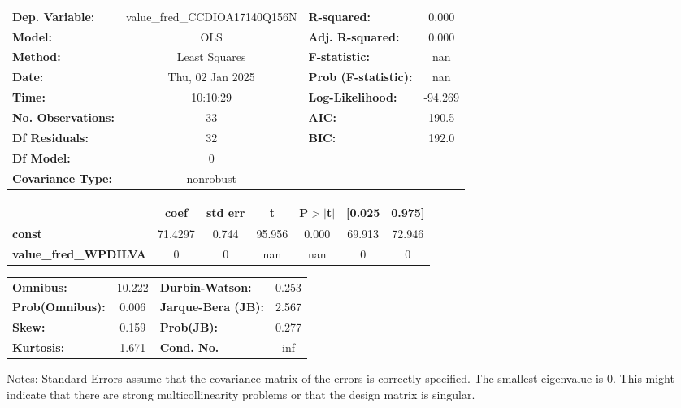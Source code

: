\begin{center}
\begin{tabular}{lclc}
\toprule
\textbf{Dep. Variable:}       & value\_fred\_CCDIOA17140Q156N & \textbf{  R-squared:         } &     0.000   \\
\textbf{Model:}               &              OLS              & \textbf{  Adj. R-squared:    } &     0.000   \\
\textbf{Method:}              &         Least Squares         & \textbf{  F-statistic:       } &       nan   \\
\textbf{Date:}                &        Thu, 02 Jan 2025       & \textbf{  Prob (F-statistic):} &      nan    \\
\textbf{Time:}                &            10:10:29           & \textbf{  Log-Likelihood:    } &   -94.269   \\
\textbf{No. Observations:}    &                 33            & \textbf{  AIC:               } &     190.5   \\
\textbf{Df Residuals:}        &                 32            & \textbf{  BIC:               } &     192.0   \\
\textbf{Df Model:}            &                  0            & \textbf{                     } &             \\
\textbf{Covariance Type:}     &           nonrobust           & \textbf{                     } &             \\
\bottomrule
\end{tabular}
\begin{tabular}{lcccccc}
                              & \textbf{coef} & \textbf{std err} & \textbf{t} & \textbf{P$> |$t$|$} & \textbf{[0.025} & \textbf{0.975]}  \\
\midrule
\textbf{const}                &      71.4297  &        0.744     &    95.956  &         0.000        &       69.913    &       72.946     \\
\textbf{value\_fred\_WPDILVA} &            0  &            0     &       nan  &           nan        &            0    &            0     \\
\bottomrule
\end{tabular}
\begin{tabular}{lclc}
\textbf{Omnibus:}       & 10.222 & \textbf{  Durbin-Watson:     } &    0.253  \\
\textbf{Prob(Omnibus):} &  0.006 & \textbf{  Jarque-Bera (JB):  } &    2.567  \\
\textbf{Skew:}          &  0.159 & \textbf{  Prob(JB):          } &    0.277  \\
\textbf{Kurtosis:}      &  1.671 & \textbf{  Cond. No.          } &      inf  \\
\bottomrule
\end{tabular}
\end{center}

Notes: \newline
 [1] Standard Errors assume that the covariance matrix of the errors is correctly specified. \newline
 [2] The smallest eigenvalue is      0. This might indicate that there are \newline
 strong multicollinearity problems or that the design matrix is singular.